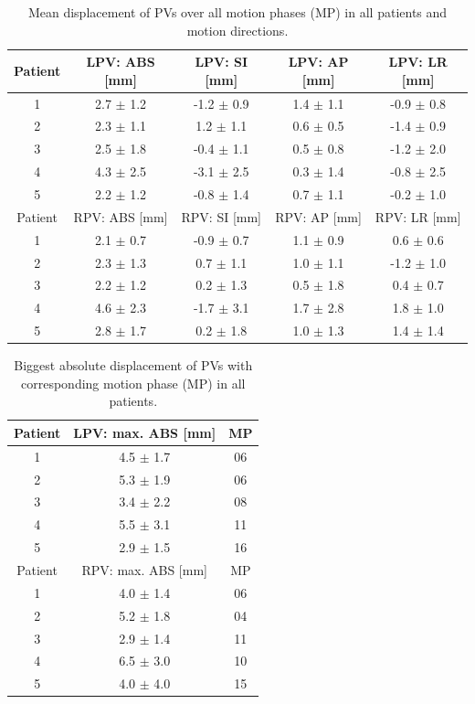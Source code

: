 \begin{table}[H]
  \centering
  \caption{Mean displacement of PVs over all motion phases (MP) in all patients and motion directions.}
  \begin{tabular}{|c|c|c|c|c|}
    \hline\hline
    Patient & LPV: ABS [mm] & LPV: SI [mm] & LPV: AP [mm] & LPV: LR [mm] \\
    \hline
    1 & 2.7 $\pm$ 1.2 & -1.2 $\pm$ 0.9 & 1.4 $\pm$ 1.1 & -0.9 $\pm$ 0.8 \\
    2 & 2.3 $\pm$ 1.1 & 1.2 $\pm$ 1.1 & 0.6 $\pm$ 0.5 & -1.4 $\pm$ 0.9 \\
    3 & 2.5 $\pm$ 1.8 & -0.4 $\pm$ 1.1 & 0.5 $\pm$ 0.8 & -1.2 $\pm$ 2.0 \\
    4 & 4.3 $\pm$ 2.5 & -3.1 $\pm$ 2.5 & 0.3 $\pm$ 1.4 & -0.8 $\pm$ 2.5 \\
    5 & 2.2 $\pm$ 1.2 & -0.8 $\pm$ 1.4 & 0.7 $\pm$ 1.1 & -0.2 $\pm$ 1.0 \\
    \hline\hline
    Patient & RPV: ABS [mm] & RPV: SI [mm] & RPV: AP [mm] & RPV: LR [mm] \\
   \hline
    1 & 2.1 $\pm$ 0.7 & -0.9 $\pm$ 0.7 & 1.1 $\pm$ 0.9 & 0.6 $\pm$ 0.6 \\
    2 & 2.3 $\pm$ 1.3 & 0.7 $\pm$ 1.1 & 1.0 $\pm$ 1.1 & -1.2 $\pm$ 1.0 \\
    3 & 2.2 $\pm$ 1.2 & 0.2 $\pm$ 1.3 & 0.5 $\pm$ 1.8 & 0.4 $\pm$ 0.7 \\
    4 & 4.6 $\pm$ 2.3 & -1.7 $\pm$ 3.1 & 1.7 $\pm$ 2.8 & 1.8 $\pm$ 1.0 \\
    5 & 2.8 $\pm$ 1.7 & 0.2 $\pm$ 1.8 & 1.0 $\pm$ 1.3 & 1.4 $\pm$ 1.4 \\
    \hline\hline
  \end{tabular}
  \label{tab:motion_pv}
\end{table}

\begin{table}[H]
  \centering
  \caption{Biggest absolute displacement of PVs with corresponding motion phase (MP) in all patients.}
  \begin{tabular}{|c|c|c|}
    \hline\hline
    Patient & LPV: max. ABS [mm] & MP \\
    \hline
    1 & 4.5 $\pm$ 1.7 & 06 \\
    2 & 5.3 $\pm$ 1.9 & 06 \\
    3 & 3.4 $\pm$ 2.2 & 08 \\
    4 & 5.5 $\pm$ 3.1 & 11 \\
    5 & 2.9 $\pm$ 1.5 & 16 \\
    \hline\hline
   Patient & RPV: max. ABS [mm] & MP \\
   \hline
    1 & 4.0 $\pm$ 1.4 & 06 \\
    2 & 5.2 $\pm$ 1.8 & 04 \\
    3 & 2.9 $\pm$ 1.4 & 11 \\
    4 & 6.5 $\pm$ 3.0 & 10 \\
    5 & 4.0 $\pm$ 4.0 & 15 \\
    \hline\hline
  \end{tabular}
  \label{tab:maxabs_pv}
\end{table}

